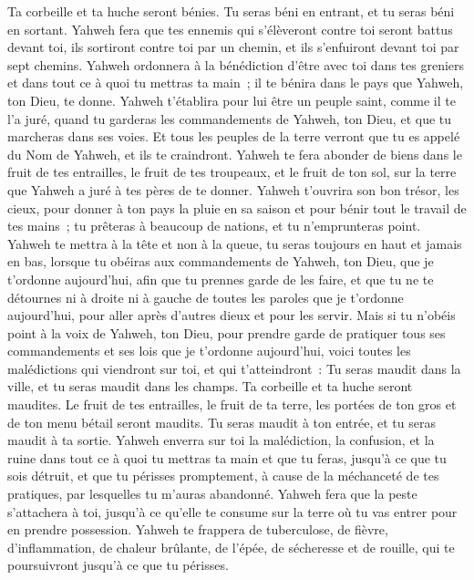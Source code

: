 \begin{multicols}{2}
Ta corbeille et ta huche seront bénies.
Tu seras béni en entrant, et tu seras béni en sortant.
Yahweh fera que tes ennemis qui s'élèveront contre toi seront battus devant toi, ils sortiront contre toi par un chemin, et ils s'enfuiront devant toi par sept chemins.
Yahweh ordonnera à la bénédiction d'être avec toi dans tes greniers et dans tout ce à quoi tu mettras ta main~; il te bénira dans le pays que Yahweh, ton Dieu, te donne.
Yahweh t'établira pour lui être un peuple saint, comme il te l'a juré, quand tu garderas les commandements de Yahweh, ton Dieu, et que tu marcheras dans ses voies.
Et tous les peuples de la terre verront que tu es appelé du Nom de Yahweh, et ils te craindront.
Yahweh te fera abonder de biens dans le fruit de tes entrailles, le fruit de tes troupeaux, et le fruit de ton sol, sur la terre que Yahweh a juré à tes pères de te donner.
Yahweh t'ouvrira son bon trésor, les cieux, pour donner à ton pays la pluie en sa saison et pour bénir tout le travail de tes mains~; tu prêteras à beaucoup de nations, et tu n'emprunteras point.
Yahweh te mettra à la tête et non à la queue, tu seras toujours en haut et jamais en bas, lorsque tu obéiras aux commandements de Yahweh, ton Dieu, que je t'ordonne aujourd'hui, afin que tu prennes garde de les faire,
et que tu ne te détournes ni à droite ni à gauche de toutes les paroles que je t'ordonne aujourd'hui, pour aller après d'autres dieux et pour les servir.
Mais si tu n'obéis point à la voix de Yahweh, ton Dieu, pour prendre garde de pratiquer tous ses commandements et ses lois que je t'ordonne aujourd'hui, voici toutes les malédictions qui viendront sur toi, et qui t'atteindront~:
Tu seras maudit dans la ville, et tu seras maudit dans les champs.
Ta corbeille et ta huche seront maudites.
Le fruit de tes entrailles, le fruit de ta terre, les portées de ton gros et de ton menu bétail seront maudits.
Tu seras maudit à ton entrée, et tu seras maudit à ta sortie.
Yahweh enverra sur toi la malédiction, la confusion, et la ruine dans tout ce à quoi tu mettras ta main et que tu feras, jusqu'à ce que tu sois détruit, et que tu périsses promptement, à cause de la méchanceté de tes pratiques, par lesquelles tu m'auras abandonné.
Yahweh fera que la peste s'attachera à toi, jusqu'à ce qu'elle te consume sur la terre où tu vas entrer pour en prendre possession.
Yahweh te frappera de tuberculose, de fièvre, d'inflammation, de chaleur brûlante, de l'épée, de sécheresse et de rouille, qui te poursuivront jusqu'à ce que tu périsses.

\end{multicols}

